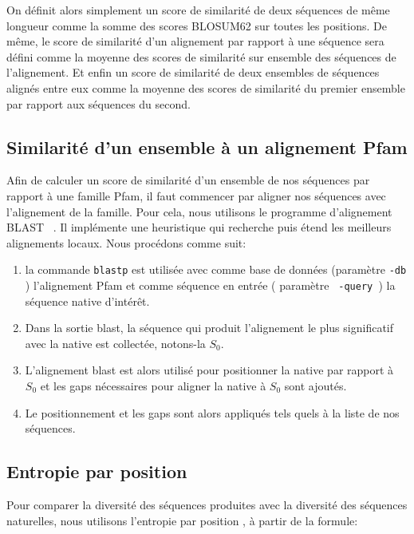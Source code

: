 On définit alors simplement un score de similarité de deux séquences de même longueur comme la somme des scores BLOSUM62 sur toutes les positions. De même, le score de similarité d'un alignement par rapport à une séquence sera défini comme la moyenne des scores de similarité sur ensemble des séquences de l'alignement. Et enfin un score de similarité de deux ensembles de séquences alignés entre eux comme la moyenne des scores de similarité du premier ensemble par rapport aux séquences du second.  

\subsection{Similarité d'un ensemble à un alignement Pfam}
\label{SimPfam}
Afin de calculer un score de similarité d'un ensemble de nos séquences par rapport à une famille Pfam, il faut commencer par aligner nos séquences avec l'alignement de la famille. Pour cela, nous utilisons le programme d'alignement BLAST ~\citep{refBLAST}. Il implémente une heuristique qui recherche puis étend les meilleurs alignements locaux. Nous procédons comme suit:
\begin{enumerate}
\item la commande \verb!blastp! est utilisée avec comme base de données (paramètre \verb!-db! ) l'alignement Pfam et comme séquence en entrée ( paramètre \verb! -query !) la séquence native d'intérêt. 
\item Dans la sortie blast, la séquence qui produit l'alignement le plus significatif avec la native est collectée, notons-la $S_0$. 
\item L'alignement blast est alors utilisé pour positionner la native par rapport à $S_0$ et les gaps nécessaires pour aligner la native à $S_0$ sont ajoutés.
\item Le positionnement et les gaps sont alors appliqués tels quels à la liste de nos séquences.

\end{enumerate}

\subsection{Entropie par position}
\label{subsection:Entropie}
Pour comparer la diversité des séquences produites avec la diversité des séquences naturelles, nous utilisons l'entropie par position \cite{DurbinBK}, à partir de la formule:

